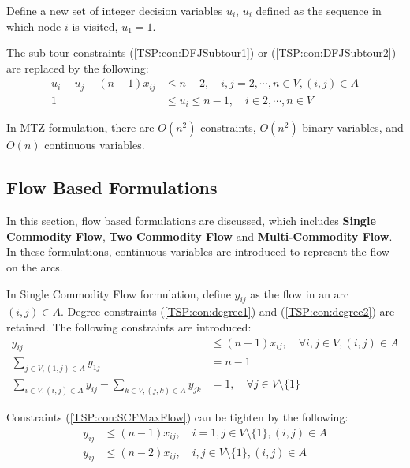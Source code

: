                 Define a new set of integer decision variables $u_i$, $u_i$ defined as the sequence in which node $i$ is visited, $u_1 = 1$.

                The sub-tour constraints (\ref{TSP:con:DFJSubtour1}) or (\ref{TSP:con:DFJSubtour2}) are replaced by the following:
                \begin{align}
                    u_i - u_j + (n - 1) x_{ij} &\le n - 2, \quad i, j = 2, \cdots, n \in V, (i, j) \in A \label{TSP:con:MTZ1}\\
                    1 & \le u_i \le n - 1, \quad i \in 2, \cdots, n \in V \label{TSP:con:MTZ2}
                \end{align}

                In MTZ formulation, there are $O(n^2)$ constraints, $O(n^2)$ binary variables, and $O(n)$ continuous variables.

            \subsection{Flow Based Formulations}
                In this section, flow based formulations are discussed, which includes \textbf{Single Commodity Flow}, \textbf{Two Commodity Flow} and \textbf{Multi-Commodity Flow}. In these formulations, continuous variables are introduced to represent the flow on the arcs.

                In Single Commodity Flow formulation, define $y_{ij}$ as the flow in an arc $(i, j) \in A$. Degree constraints (\ref{TSP:con:degree1}) and (\ref{TSP:con:degree2}) are retained. The following constraints are introduced:
                \begin{align}
                    y_{ij} & \le (n - 1) x_{ij}, \quad \forall i, j \in V, (i, j) \in A \label{TSP:con:SCFMaxFlow}\\
                    \sum_{j \in V, (1, j) \in A} y_{1j} & = n - 1 \label{TSP:con:SCFInitFlow} \\
                    \sum_{i \in V, (i, j) \in A} y_{ij} - \sum_{k \in V, (j, k) \in A} y_{jk} &= 1, \quad \forall j \in V \setminus \{1\} \label{TSP:con:SCFFlowBalance}
                \end{align}

                Constraints (\ref{TSP:con:SCFMaxFlow}) can be tighten by the following:
                \begin{align}
                    y_{ij} &\le (n - 1) x_{ij}, \quad i = 1, j \in V \setminus \{1\}, (i, j) \in A \label{TSP:con:SCMMaxFlow1} \\
                    y_{ij} &\le (n - 2) x_{ij}, \quad i, j \in V \setminus \{1\}, (i, j) \in A \label{TSP:con:SCMMaxFlow2}
                \end{align}


